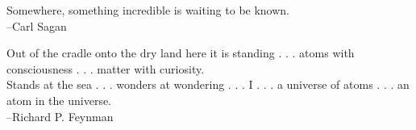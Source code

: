 \documentclass[11pt]{psuthesis}
\begin{document}
\begin{frontmatter}

\clearpage

\vspace*{2.0truein}

%
\parbox{4.0truein}{
\par\noindent
Somewhere, something incredible is waiting to be known.\\
\hspace*{\fill}--Carl Sagan
}

\vspace{4pc}

\parbox{4.0truein}{
\par\noindent
Out of the cradle onto the dry land here it is standing . . . atoms with consciousness . . . matter with curiosity.\\
Stands at the sea . . . wonders at wondering . . . I . . . a universe of atoms . . . an atom in the universe.\\
\hspace*{\fill}--Richard P. Feynman
}
\end{frontmatter}










%

\appendices

\end{document}
